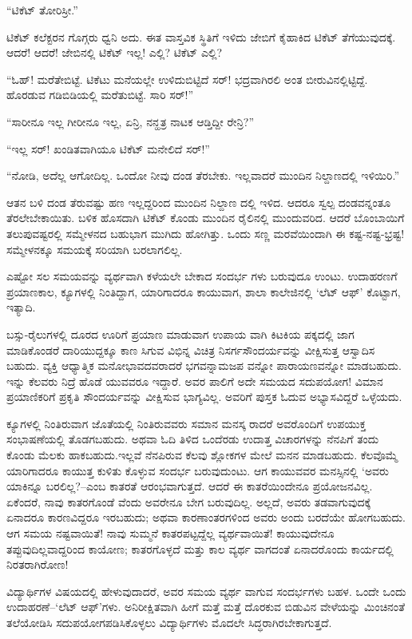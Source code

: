“ಟಿಕೆಟ್ ತೋರಿಸ್ರೀ.”

ಟಿಕೆಟ್ ಕಲೆಕ್ಟರನ ಗೊಗ್ಗರು ಧ್ವನಿ ಅದು. ಈತ ವಾಸ್ತವಿಕ ಸ್ಥಿತಿಗೆ ಇಳಿದು ಜೇಬಿಗೆ ಕೈಹಾಕಿದ ಟಿಕೆಟ್ ತೆಗೆಯುವುದಕ್ಕೆ. ಆದರೆ! ಆದರೆ! ಜೇಬಿನಲ್ಲಿ ಟಿಕೆಟ್ ಇಲ್ಲ! ಎಲ್ಲಿ? ಟಿಕೆಟ್ ಎಲ್ಲಿ? 

“ಓಹ್! ಮರೆತೇಬಿಟ್ಟೆ. ಟಿಕೆಟು ಮನೆಯಲ್ಲೇ ಉಳಿದುಬಿಟ್ಟಿದೆ ಸರ್! ಭದ್ರವಾಗಿರಲಿ ಅಂತ ಬೀರುವಿನಲ್ಲಿಟ್ಟಿದ್ದೆ. ಹೊರಡುವ ಗಡಿಬಿಡಿಯಲ್ಲಿ ಮರೆತುಬಿಟ್ಟೆ. ಸಾರಿ ಸರ್!”

“ಸಾರೀನೂ ಇಲ್ಲ ಗೀರೀನೂ ಇಲ್ಲ, ಏನ್ರಿ, ನನ್ಹತ್ರ ನಾಟಕ ಆಡ್ತಿದ್ದೀ ರೇನ್ರಿ?”

“ಇಲ್ಲ ಸರ್! ಖಂಡಿತವಾಗಿಯೂ ಟಿಕೆಟ್ ಮನೇಲಿದೆ ಸರ್!”

“ನೋಡಿ, ಅದೆಲ್ಲ ಆಗೋದಿಲ್ಲ. ಒಂದೋ ನೀವು ದಂಡ ತೆರಬೇಕು. ಇಲ್ಲವಾದರೆ ಮುಂದಿನ ನಿಲ್ದಾಣದಲ್ಲಿ ಇಳಿಯಿರಿ.”

ಆತನ ಬಳಿ ದಂಡ ತೆರುವಷ್ಟು ಹಣ ಇಲ್ಲದ್ದರಿಂದ ಮುಂದಿನ ನಿಲ್ದಾಣ ದಲ್ಲಿ ಇಳಿದ. ಆದರೂ ಸ್ವಲ್ಪ ದಂಡವನ್ನಂತೂ ತೆರಲೇಬೇಕಾಯಿತು. ಬಳಿಕ ಹೊಸದಾಗಿ ಟಿಕೆಟ್ ಕೊಂಡು ಮುಂದಿನ ರೈಲಿನಲ್ಲಿ ಮುಂದುವರಿದ. ಆದರೆ ಬೊಂಬಾಯಿಗೆ ತಲುಪುವಷ್ಟರಲ್ಲಿ ಸಮ್ಮೇಳನದ ಬಹುಭಾಗ ಮುಗಿದು ಹೋಗಿತ್ತು. ಒಂದು ಸಣ್ಣ ಮರವೆಯಿಂದಾಗಿ ಈ ಕಷ್ಟ-ನಷ್ಟ-ಭ್ರಷ್ಟ! ಸಮ್ಮೇಳನಕ್ಕೂ ಸಮಯಕ್ಕೆ ಸರಿಯಾಗಿ ಬರಲಾಗಲಿಲ್ಲ.

ಎಷ್ಟೋ ಸಲ ಸಮಯವನ್ನು ವ್ಯರ್ಥವಾಗಿ ಕಳೆಯಲೇ ಬೇಕಾದ ಸಂದರ್ಭ ಗಳು ಬರುವುದೂ ಉಂಟು. ಉದಾಹರಣಗೆ ಪ್ರಯಾಣಕಾಲ, ಕ್ಯೂಗಳಲ್ಲಿ ನಿಂತಿದ್ದಾಗ, ಯಾರಿಗಾದರೂ ಕಾಯುವಾಗ, ಶಾಲಾ ಕಾಲೇಜಿನಲ್ಲಿ ‘ಲೆಟ್ ಆಫ್​’ ಕೊಟ್ಟಾಗ, ಇತ್ಯಾದಿ.

ಬಸ್ಸು-ರೈಲುಗಳಲ್ಲಿ ದೂರದ ಊರಿಗೆ ಪ್ರಯಾಣ ಮಾಡುವಾಗ ಉಪಾಯ ವಾಗಿ ಕಿಟಕಿಯ ಪಕ್ಕದಲ್ಲಿ ಜಾಗ ಮಾಡಿಕೊಂಡರೆ ದಾರಿಯುದ್ದಕ್ಕೂ ಕಾಣ ಸಿಗುವ ವಿಭಿನ್ನ ವಿಚಿತ್ರ ನಿಸರ್ಗಸೌಂದರ್ಯವನ್ನು ವೀಕ್ಷಿಸುತ್ತ ಆಸ್ವಾದಿಸ ಬಹುದು. ವ್ಯಕ್ತಿ ಆಧ್ಯಾತ್ಮಿಕ ಮನೋಭಾವದವರಾದರೆ ಭಗವನ್ನಾಮಜಪ ವನ್ನೋ ಪಾರಾಯಣವನ್ನೋ ಮಾಡಬಹುದು. ಇನ್ನು ಕೆಲವರು ನಿದ್ರೆ ಹೊಡೆ ಯುವವರೂ ಇದ್ದಾರೆ. ಅವರ ಪಾಲಿಗೆ ಅದೇ ಸಮಯದ ಸದುಪಯೋಗ! ವಿಮಾನ ಪ್ರಯಾಣಿಕರಿಗೆ ಪ್ರಕೃತಿ ಸೌಂದರ್ಯವನ್ನು ವೀಕ್ಷಿಸುವ ಭಾಗ್ಯವಿಲ್ಲ. ಅವರಿಗೆ ಪುಸ್ತಕ ಓದುವ ಅಭ್ಯಾಸವಿದ್ದರೆ ಒಳ್ಳೆಯದು.

ಕ್ಯೂಗಳಲ್ಲಿ ನಿಂತಿರುವಾಗ ಜೊತೆಯಲ್ಲಿ ನಿಂತಿರುವವರು ಸಮಾನ ಮನಸ್ಕ ರಾದರೆ ಅವರೊಂದಿಗೆ ಉಪಯುಕ್ತ ಸಂಭಾಷಣೆಯಲ್ಲಿ ತೊಡಗಬಹುದು. ಅಥವಾ ಓದಿ ತಿಳಿದ ಒಂದೆರಡು ಉದಾತ್ತ ವಿಚಾರಗಳನ್ನು ನೆನಪಿಗೆ ತಂದು ಕೊಂಡು ಮೆಲಕು ಹಾಕಬಹುದು.ಇಲ್ಲವೆ ನೆನಪಿರುವ ಕೆಲವು ಶ್ಲೋಕಗಳ ಮೇಲೆ ಮನನ ಮಾಡಬಹುದು. ಕೆಲವೊಮ್ಮೆ ಯಾರಿಗಾದರೂ ಕಾಯುತ್ತ ಕುಳಿತು ಕೊಳ್ಳುವ ಸಂದರ್ಭ ಬರುವುದುಂಟು. ಆಗ ಕಾಯುವವರ ಮನಸ್ಸಿನಲ್ಲಿ ‘ಅವರು ಯಾಕಿನ್ನೂ ಬರಲಿಲ್ಲ?–ಎಂಬ ಕಾತರತೆ ಆರಂಭವಾಗುತ್ತದೆ. ಆದರೆ ಈ ಕಾತರೆಯಿಂದೇನೂ ಪ್ರಯೋಜನವಿಲ್ಲ. ಏಕೆಂದರೆ, ನಾವು ಕಾತರಗೊಂಡೆ ವೆಂದು ಅವರೇನೂ ಬೇಗ ಬರುವುದಿಲ್ಲ. ಅಲ್ಲದೆ, ಅವರು ತಡವಾಗುವುದಕ್ಕೆ ಏನಾದರೂ ಕಾರಣವಿದ್ದರೂ ಇರಬಹುದು; ಅಥವಾ ಕಾರಣಾಂತರಗಳಿಂದ ಅವರು ಅಂದು ಬರದೆಯೇ ಹೋಗಬಹುದು. ಆಗ ಸಮಯ ನಷ್ಟವಾಯಿತೆ! ನಾವು ಸುಮ್ಮನೆ ಕಾತರಪಟ್ಟದ್ದೆಲ್ಲ ವ್ಯರ್ಥವಾಯಿತೆ! ಕಾಯುವುದೇನೂ ತಪ್ಪುವುದಿಲ್ಲವಾದ್ದರಿಂದ ಕಾಯೋಣ; ಕಾತರಗೊಳ್ಳದೆ ಮತ್ತು ಕಾಲ ವ್ಯರ್ಥ ವಾಗದಂತೆ ಏನಾದರೊಂದು ಕಾರ್ಯದಲ್ಲಿ ನಿರತರಾಗಿರೋಣ!

ವಿದ್ಯಾರ್ಥಿಗಳ ವಿಷಯದಲ್ಲಿ ಹೇಳುವುದಾದರೆ, ಅವರ ಸಮಯ ವ್ಯರ್ಥ ವಾಗುವ ಸಂದರ್ಭಗಳು ಬಹಳ. ಒಂದೇ ಒಂದು ಉದಾಹರಣೆ–‘ಲೆಟ್ ಆಫ್​’ಗಳು. ಅನಿರೀಕ್ಷಿತವಾಗಿ ಹೀಗೆ ಮತ್ತೆ ಮತ್ತೆ ದೊರಕುವ ಬಿಡುವಿನ ವೇಳೆಯನ್ನು ಮಿಂಚಿನಂತೆ ತಲೆಯೋಡಿಸಿ ಸದುಪಯೋಗಪಡಿಸಿಕೊಳ್ಳಲು ವಿದ್ಯಾರ್ಥಿಗಳು ಮೊದಲೇ ಸಿದ್ಧರಾಗಿರಬೇಕಾಗುತ್ತದೆ. 

